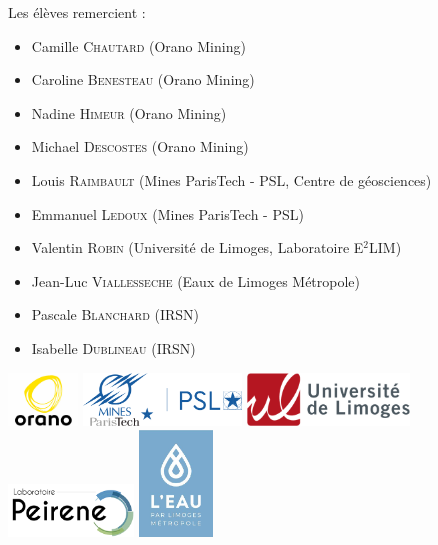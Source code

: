 \documentclass{article}
\begin{document}
Les élèves remercient : 
\begin{itemize}
    \item Camille \textsc{Chautard} (Orano Mining)
    \item Caroline \textsc{Benesteau} (Orano Mining)
    \item Nadine \textsc{Himeur} (Orano Mining)
    \item Michael \textsc{Descostes} (Orano Mining) 
    \item Louis \textsc{Raimbault} (Mines ParisTech - PSL, Centre de géosciences) 
    \item  Emmanuel \textsc{Ledoux} (Mines ParisTech - PSL)
    \item Valentin \textsc{Robin} (Université de Limoges, Laboratoire E$^2$LIM) 
    \item Jean-Luc \textsc{Viallesseche} (Eaux de Limoges Métropole)
    \item Pascale \textsc{Blanchard} (IRSN)  
    \item Isabelle \textsc{Dublineau} (IRSN)

\end{itemize}
\includegraphics[height = 40pt]{oranologo.png}
\includegraphics[height = 40pt ]{logoMPT.png}%
\includegraphics[height = 40pt ]{logoUNILIM.png}
\includegraphics[height = 40pt ]{Logo-PEIRENE.png}
\includegraphics[height = 80pt ]{logoeaulimoges.png}
\end{document}
